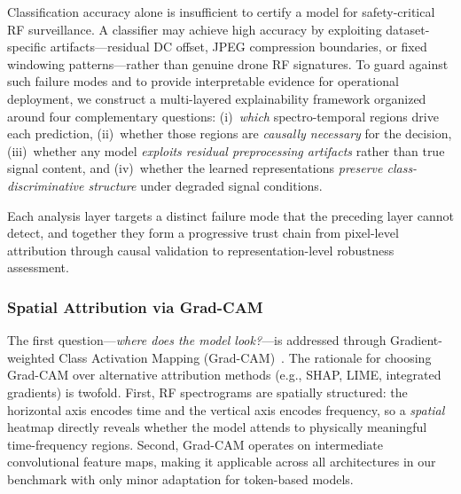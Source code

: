 \documentclass[runningheads]{llncs}
\begin{document}
Classification accuracy alone is insufficient to certify a model for safety-critical RF surveillance. A classifier may achieve high accuracy by exploiting dataset-specific artifacts---residual DC offset, JPEG compression boundaries, or fixed windowing patterns---rather than genuine drone RF signatures. To guard against such failure modes and to provide interpretable evidence for operational deployment, we construct a multi-layered explainability framework organized around four complementary questions: (i)~\emph{which} spectro-temporal regions drive each prediction, (ii)~whether those regions are \emph{causally necessary} for the decision, (iii)~whether any model \emph{exploits residual preprocessing artifacts} rather than true signal content, and (iv)~whether the learned representations \emph{preserve class-discriminative structure} under degraded signal conditions.

Each analysis layer targets a distinct failure mode that the preceding layer cannot detect, and together they form a progressive trust chain from pixel-level attribution through causal validation to representation-level robustness assessment.

\subsubsection{Spatial Attribution via Grad-CAM}

The first question---\emph{where does the model look?}---is addressed through Gradient-weighted Class Activation Mapping (Grad-CAM)~\cite{ref30}. The rationale for choosing Grad-CAM over alternative attribution methods (e.g., SHAP, LIME, integrated gradients) is twofold. First, RF spectrograms are spatially structured: the horizontal axis encodes time and the vertical axis encodes frequency, so a \emph{spatial} heatmap directly reveals whether the model attends to physically meaningful time-frequency regions. Second, Grad-CAM operates on intermediate convolutional feature maps, making it applicable across all architectures in our benchmark with only minor adaptation for token-based models.
\end{document}
